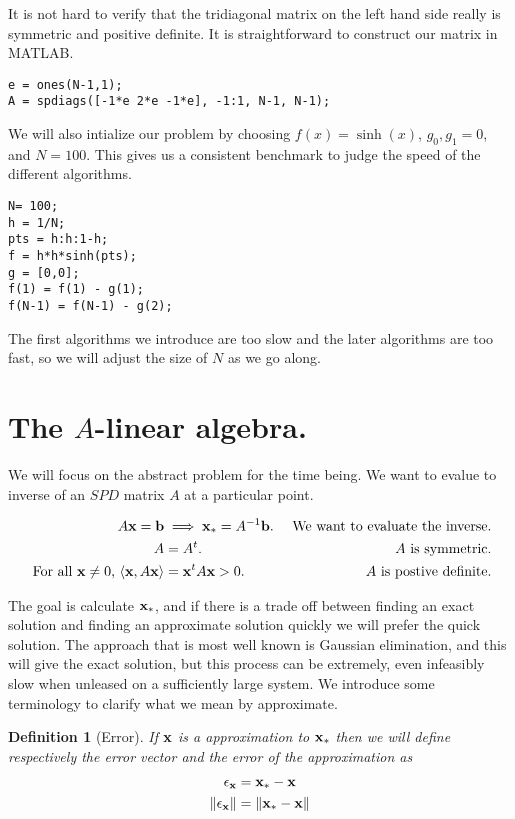 \documentclass{article}
\newcommand{\bx}{{\bf x}}
\newcommand{\bb}{{\bf b}}
\newtheorem{defn}{Definition}[section]
\theoremstyle{remark}
\begin{document}
It is not hard to verify that the tridiagonal matrix on the left hand side really is  symmetric and positive definite. It is straightforward to construct our matrix in MATLAB. 

\begin{lstlisting}
e = ones(N-1,1);
A = spdiags([-1*e 2*e -1*e], -1:1, N-1, N-1);
\end{lstlisting}

We will also intialize our problem by choosing $f(x) = \sinh(x)$, $g_0,g_1 = 0$, and $N = 100$. This gives us a consistent benchmark to judge the speed of the different algorithms.
\begin{lstlisting}
N= 100;
h = 1/N;
pts = h:h:1-h;
f = h*h*sinh(pts);
g = [0,0];
f(1) = f(1) - g(1);
f(N-1) = f(N-1) - g(2);
\end{lstlisting}

The first algorithms we introduce are too slow and the later algorithms are too fast, so we will adjust the size of $N$ as we go along. 


\section{The $A$-linear algebra.}

We will focus on the abstract problem for the time being. We want to evalue to inverse of an $SPD$ matrix $A$ at a particular point. 

\begin{align}
\label{eq:main}
A\bx = \bb &\implies \bx_* = A^{-1}\bb. &\text{ We want to evaluate the inverse.}\\
A &= A^t. &\text{ $A$ is symmetric.}\\
\text{ For all $\bx \neq 0$, }\langle \bx, A\bx \rangle &= \bx^t A \bx > 0. &\text{ $A$ is postive definite.}
\end{align}

The goal is calculate $\bx_*$, and if there is a trade off between finding an exact solution and finding an approximate solution quickly we will prefer the quick solution. The approach that is most well known is Gaussian elimination, and this will give the exact solution, but this process can be extremely, even infeasibly slow when unleased on a sufficiently large system. We introduce some terminology to clarify what we mean by approximate. 

\begin{defn}[Error] If $\bx$ is a approximation to $\bx_*$ then we will define respectively the error vector and the error of the approximation as 
\begin{align}
{\bf \epsilon}_\bx &= \bx_*-\bx\\
\|\epsilon_\bx\| &= \|\bx_* - \bx \|
\end{align}
\end{defn}
\end{document}

